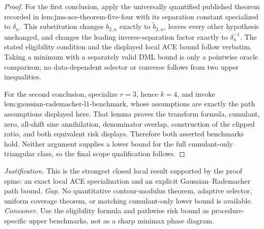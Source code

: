 \documentclass{article}
\begin{document}
\begin{proof}
For the first conclusion, apply the universally quantified published theorem recorded in \(\text{lem:jms-ace-theorem-five-four}\) with its separation constant specialized to \(\delta_n\).  This substitution changes \(b_{2,n}\) exactly to \(\widetilde b_{2,n}\), leaves every other hypothesis unchanged, and changes the leading inverse-separation factor exactly to \(\delta_n^{-1}\).  The stated eligibility condition and the displayed local ACE bound follow verbatim.  Taking a minimum with a separately valid DML bound is only a pointwise oracle comparison; no data-dependent selector or converse follows from two upper inequalities.

For the second conclusion, specialize \(r=3\), hence \(k=4\), and invoke \(\text{lem:gaussian-rademacher-l1-benchmark}\), whose assumptions are exactly the path assumptions displayed here.  That lemma proves the transform formula, cumulant, zero, all-shift sine annihilation, denominator overlap, construction of the clipped ratio, and both equivalent risk displays.  Therefore both asserted benchmarks hold.  Neither argument supplies a lower bound for the full cumulant-only triangular class, so the final scope qualification follows.
\end{proof}
\par\smallskip\noindent \textit{Justification.} This is the strongest closed local result supported by the proof spine: an exact local ACE specialization and an explicit Gaussian--Rademacher path bound. \textit{Gap.} No quantitative contour-modulus theorem, adaptive selector, uniform coverage theorem, or matching cumulant-only lower bound is available. \textit{Consumer.} Use the eligibility formula and pathwise risk bound as procedure-specific upper benchmarks, not as a sharp minimax phase diagram.
\end{document}
